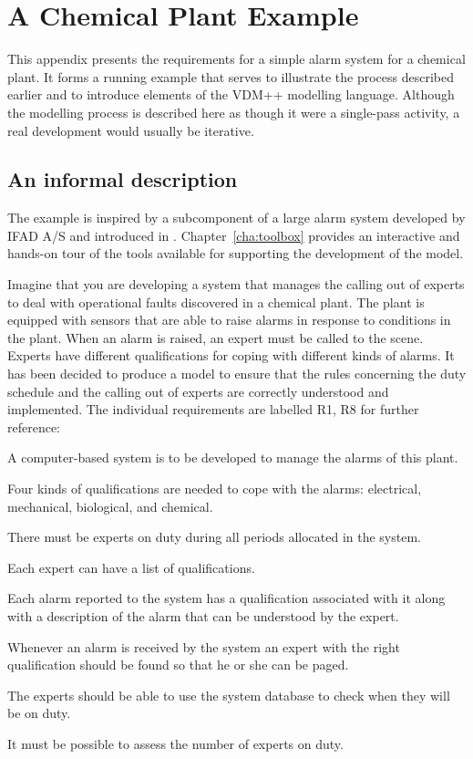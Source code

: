 \appendix

\chapter{A Chemical Plant Example}\label{app:alarm}

This appendix presents the requirements for a simple alarm system for a
chemical plant. It forms a running example that serves to illustrate
the process described earlier and to introduce elements of the VDM++
modelling language. Although the modelling process is described here
as though it were a single-pass activity, a real development would
usually be iterative. 


\section{An informal description}



The example is inspired by a subcomponent of a large
alarm system developed by IFAD A/S and introduced in 
\cite{Fitzgerald&98b}. 
Chapter~\ref{cha:toolbox} provides an interactive and hands-on tour of
the tools available for supporting the development of the model.

Imagine that you are developing a system that manages the calling out
of experts to deal with operational faults discovered in a chemical
plant.  The plant is equipped with sensors that are able to raise
alarms in response to conditions in the plant.  When an alarm is
raised, an expert must be called to the scene.  Experts have different
qualifications for coping with different kinds of alarms. It has been
decided to produce a model to ensure that the rules
concerning the duty schedule and the calling out of experts are
correctly understood and implemented. The individual requirements are
labelled R1, R8 for further reference:

\begin{reqs}
\item A computer-based system is to be developed to manage the alarms 
of this plant.
\item Four kinds of qualifications are needed to cope with the alarms: 
 electrical, mechanical, biological, and chemical.
\item There must be experts on duty during all periods allocated in 
the system.
\item Each expert can have a list of qualifications.
\item Each alarm reported to the system has a qualification associated 
with it along with a description of the alarm that can be understood 
by the expert.
\item Whenever an alarm is received by the system an expert with the 
right qualification should be found so that he or she can be 
paged.
\item The experts should be able to use the system database to check 
when they will be on duty.
\item It must be possible to assess the number of experts on duty.
\end{reqs}

